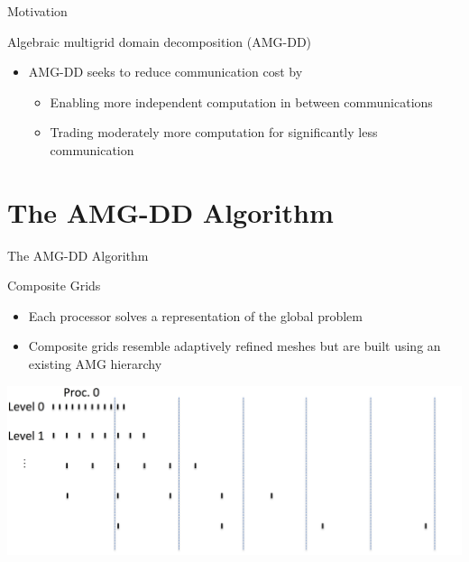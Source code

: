 \documentclass[18pt,xcolor=table]{beamer}
\begin{document}
\begin{frame}{Motivation}
\begin{block}{Algebraic multigrid domain decomposition (AMG-DD)}
\begin{itemize}
\item AMG-DD seeks to reduce communication cost by
\begin{itemize}
\item Enabling more independent computation in between communications
\item Trading moderately more computation for significantly less communication
\end{itemize}
\end{itemize}
\end{block}

\end{frame}


\section{The AMG-DD Algorithm}

\begin{frame}{The AMG-DD Algorithm}
\begin{block}{Composite Grids}
\begin{itemize}
\item Each processor solves a representation of the global problem
\item Composite grids resemble adaptively refined meshes but are built using an existing AMG hierarchy
\end{itemize}
\end{block}
\centering
\includegraphics[width=\textwidth]{figures/compGridCreation1D13}
\end{frame}
\end{document}
